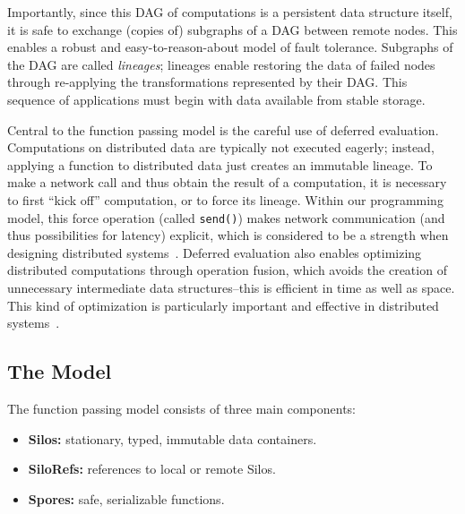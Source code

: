 \documentclass{jfp1}
\begin{document}
Importantly, since this DAG of computations is a persistent data structure
itself, it is safe to exchange (copies of) subgraphs of a DAG between remote
nodes. This enables a robust and easy-to-reason-about model of fault tolerance.
Subgraphs of the DAG are called \textit{lineages}; lineages enable restoring the data
of failed nodes through re-applying the transformations represented by their
DAG. This sequence of applications must begin with data available from stable
storage.

Central to the function passing model is the careful use of deferred evaluation.
Computations on distributed data are typically not executed eagerly; instead,
applying a function to distributed data just creates an immutable lineage. To
make a network call and thus obtain the result of a computation, it is necessary
to first ``kick off'' computation, or to force its lineage. Within our
programming model, this force operation (called \verb|send()|) makes network
communication (and thus possibilities for latency) explicit, which is considered
to be a strength when designing distributed systems~\cite{ANoteDistComp}.
Deferred evaluation also enables optimizing distributed computations through
operation fusion, which avoids the creation of unnecessary intermediate data
structures--this is efficient in time as well as space. This kind of
optimization is particularly important and effective in distributed
systems~\cite{FlumeJava}.


\subsection{The Model}

The function passing model consists of three main components:
\begin{itemize}[noitemsep]
  \item {\bf Silos:} stationary, typed, immutable data containers.
  \item {\bf SiloRefs:} references to local or remote Silos.
  \item {\bf Spores:} safe, serializable functions.
\end{itemize}
\vspace{1mm}
\end{document}
